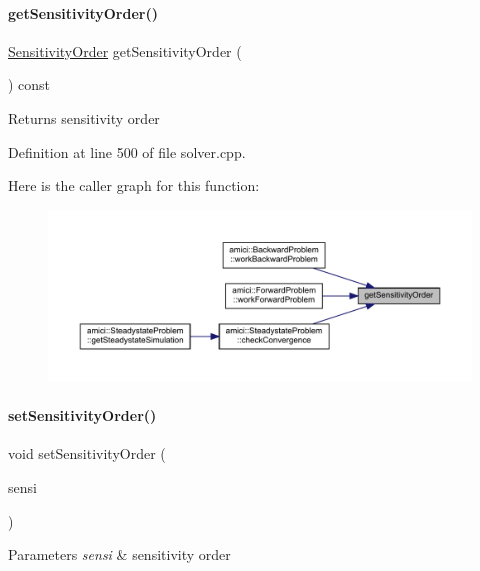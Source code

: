 \paragraph{\texorpdfstring{getSensitivityOrder()}{getSensitivityOrder()}}
{\footnotesize\ttfamily \mbox{\hyperlink{namespaceamici_aaa03ec2f8c4d5323b98d71134a462fda}{Sensitivity\+Order}} get\+Sensitivity\+Order (\begin{DoxyParamCaption}{ }\end{DoxyParamCaption}) const}

\begin{DoxyReturn}{Returns}
sensitivity order 
\end{DoxyReturn}


Definition at line 500 of file solver.\+cpp.

Here is the caller graph for this function\+:
\nopagebreak
\begin{figure}[H]
\begin{center}
\leavevmode
\includegraphics[width=350pt]{classamici_1_1_solver_affde3089fec2a1cca40d6cc0c4c2cf1d_icgraph}
\end{center}
\end{figure}
\mbox{\label{classamici_1_1_solver_a26129f061fdf7869be2d3e4aa22532b6}} 
\paragraph{\texorpdfstring{setSensitivityOrder()}{setSensitivityOrder()}}
{\footnotesize\ttfamily void set\+Sensitivity\+Order (\begin{DoxyParamCaption}\item[{\mbox{\hyperlink{namespaceamici_aaa03ec2f8c4d5323b98d71134a462fda}{Sensitivity\+Order}}}]{sensi }\end{DoxyParamCaption})}


\begin{DoxyParams}{Parameters}
{\em sensi} & sensitivity order \\
\hline
\end{DoxyParams}


